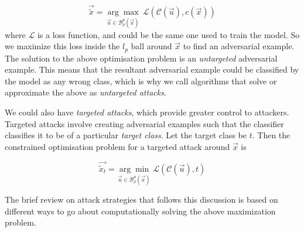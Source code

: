 \documentclass[12pt, oneside]{book}
\begin{document}
\begin{equation*}
    \vec{\tilde{x}} = \underset{\vec{u} \in \mathcal{B}_\rho^p(\vec{x})}
    {\arg\max}~\mathcal{L}(\mathcal{C}(\vec{u}), c(\vec{x}))
\end{equation*}
where $\mathcal{L}$ is a loss function, and could be the same one used to train
the model. So we maximize this loss inside the $l_p$ ball around $\vec{x}$ to
find an adversarial example. The solution to the above optimisation problem is
an \emph{untargeted} adversarial example. This means that the resultant
adversarial example could be classified by the model as any wrong class, which
is why we call algorithms that solve or approximate the above as
\emph{untargeted attacks}.

We could also have \emph{targeted attacks}, which provide greater control to
attackers. Targeted attacks involve creating adversarial examples such that the
classifier classifies it to be of a particular \emph{target class}. Let the
target class be $t$. Then the constrained optimisation problem for a targeted
attack around $\vec{x}$ is

\begin{equation*}
    \vec{\tilde{x}_t} = \underset{\vec{u} \in \mathcal{B}_\rho^p(\vec{x})}
    {\arg\min}~\mathcal{L}(\mathcal{C}(\vec{u}), t)
\end{equation*}


The brief review on attack strategies that follows this discussion is based on
different ways to go about computationally solving the above maximization
problem.
\end{document}
